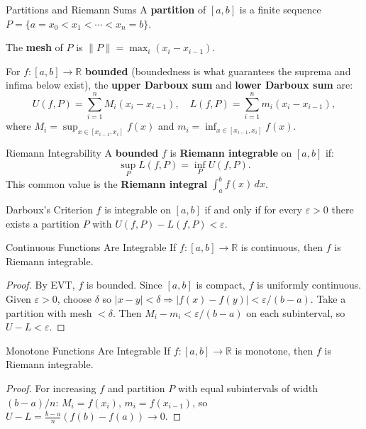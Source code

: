 \documentclass[12pt, openany]{book}
\theoremstyle{plain}
\theoremstyle{definition}
\theoremstyle{remark}
\newcommand{\R}{\mathbb{R}}
\newcommand{\eps}{\varepsilon}
\newcommand{\del}{\delta}
\begin{document}
\begin{defbox}{Partitions and Riemann Sums}
A \textbf{partition} of $[a,b]$ is a finite sequence $P = \{a = x_0 < x_1 < \cdots < x_n = b\}$.

The \textbf{mesh} of $P$ is $\|P\| = \max_i (x_i - x_{i-1})$.

For $f : [a,b] \to \R$ \textbf{bounded} (boundedness is what guarantees the suprema and infima below exist), the \textbf{upper Darboux sum} and \textbf{lower Darboux sum} are:
\[ U(f, P) = \sum_{i=1}^n M_i(x_i - x_{i-1}), \quad L(f, P) = \sum_{i=1}^n m_i(x_i - x_{i-1}), \]
where $M_i = \sup_{x \in [x_{i-1},x_i]} f(x)$ and $m_i = \inf_{x \in [x_{i-1},x_i]} f(x)$.
\end{defbox}
\color{black}

\begin{defbox}{Riemann Integrability}
A \textbf{bounded} $f$ is \textbf{Riemann integrable} on $[a,b]$ if:
\[ \sup_P L(f,P) = \inf_P U(f,P). \]
This common value is the \textbf{Riemann integral} $\int_a^b f(x)\,dx$.
\end{defbox}
\color{black}

\begin{thmbox}{Darboux's Criterion}
$f$ is integrable on $[a,b]$ if and only if for every $\eps > 0$ there exists a partition $P$ with $U(f,P) - L(f,P) < \eps$.
\end{thmbox}
\color{black}

\begin{thmbox}{Continuous Functions Are Integrable}
If $f : [a,b] \to \R$ is continuous, then $f$ is Riemann integrable.
\end{thmbox}
\color{black}

\begin{proof}
By EVT, $f$ is bounded. Since $[a,b]$ is compact, $f$ is uniformly continuous. Given $\eps > 0$, choose $\del$ so $|x-y| < \del \Rightarrow |f(x)-f(y)| < \eps/(b-a)$. Take a partition with mesh $< \del$. Then $M_i - m_i < \eps/(b-a)$ on each subinterval, so $U - L < \eps$.
\end{proof}

\begin{thmbox}{Monotone Functions Are Integrable}
If $f : [a,b] \to \R$ is monotone, then $f$ is Riemann integrable.
\end{thmbox}
\color{black}

\begin{proof}
For increasing $f$ and partition $P$ with equal subintervals of width $(b-a)/n$: $M_i = f(x_i)$, $m_i = f(x_{i-1})$, so $U - L = \frac{b-a}{n}(f(b)-f(a)) \to 0$.
\end{proof}
\end{document}
